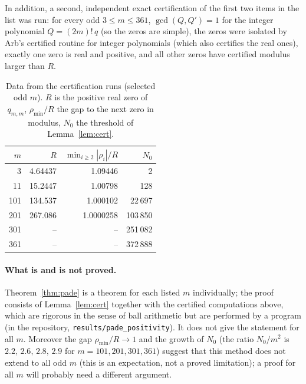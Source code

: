 In addition, a second, independent exact certification of the first two items in the list was run: for every odd $3\le m\le361$, $\gcd(Q,Q')=1$ for the integer polynomial $Q=(2m)!\,q$ (so the zeros are simple), the zeros were isolated by Arb's certified routine for integer polynomials (which also certifies the real ones), exactly one zero is real and positive, and all other zeros have certified modulus larger than $R$.

\begin{table}[h]
\centering
\caption{Data from the certification runs (selected odd $m$). $R$ is the positive real zero of $q_{m,m}$, $\rho_{\min}/R$ the gap to the next zero in modulus, $N_0$ the threshold of Lemma~\ref{lem:cert}.}\label{tab:pade}
\begin{tabular}{rrrr}
\toprule
$m$ & $R$ & $\min_{i\ge2}|\rho_i|/R$ & $N_0$\\
\midrule
3 & 4.64437 & 1.09446 & 2\\
11 & 15.2447 & 1.00798 & 128\\
101 & 134.537 & 1.000102 & 22\,697\\
201 & 267.086 & 1.0000258 & 103\,850\\
301 & -- & -- & 251\,082\\
361 & -- & -- & 372\,888\\
\bottomrule
\end{tabular}
\end{table}

\paragraph{What is and is not proved.} Theorem~\ref{thm:pade} is a theorem for each listed $m$ individually; the proof consists of Lemma~\ref{lem:cert} together with the certified computations above, which are rigorous in the sense of ball arithmetic but are performed by a program (in the repository, \texttt{results/pade\_positivity}). It does not give the statement for all $m$. Moreover the gap $\rho_{\min}/R\to1$ and the growth of $N_0$ (the ratio $N_0/m^2$ is $2.2,\,2.6,\,2.8,\,2.9$ for $m=101,201,301,361$) suggest that this method does not extend to all odd $m$ (this is an expectation, not a proved limitation); a proof for all $m$ will probably need a different argument.

